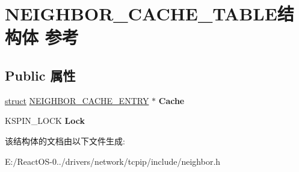 \hypertarget{struct_n_e_i_g_h_b_o_r___c_a_c_h_e___t_a_b_l_e}{}\section{N\+E\+I\+G\+H\+B\+O\+R\+\_\+\+C\+A\+C\+H\+E\+\_\+\+T\+A\+B\+L\+E结构体 参考}
\label{struct_n_e_i_g_h_b_o_r___c_a_c_h_e___t_a_b_l_e}
\subsection*{Public 属性}
\begin{DoxyCompactItemize}
\item 
\mbox{\label{struct_n_e_i_g_h_b_o_r___c_a_c_h_e___t_a_b_l_e_afd3f54ce6624e33709547b4119af079d}} 
\hyperlink{interfacestruct}{struct} \hyperlink{struct_n_e_i_g_h_b_o_r___c_a_c_h_e___e_n_t_r_y}{N\+E\+I\+G\+H\+B\+O\+R\+\_\+\+C\+A\+C\+H\+E\+\_\+\+E\+N\+T\+RY} $\ast$ {\bfseries Cache}
\item 
\mbox{\label{struct_n_e_i_g_h_b_o_r___c_a_c_h_e___t_a_b_l_e_ad841e1c7c618b795beef0b23832819e9}} 
K\+S\+P\+I\+N\+\_\+\+L\+O\+CK {\bfseries Lock}
\end{DoxyCompactItemize}


该结构体的文档由以下文件生成\+:\begin{DoxyCompactItemize}
\item 
E\+:/\+React\+O\+S-\/0../drivers/network/tcpip/include/neighbor.\+h\end{DoxyCompactItemize}
